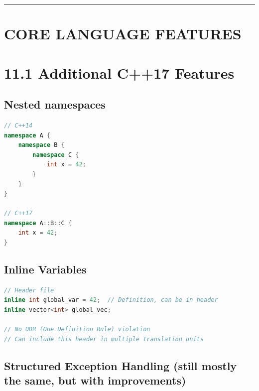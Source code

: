 \begin{center}\rule{0.5\linewidth}{0.5pt}\end{center}

\hypertarget{core-language-features}{%
\section{CORE LANGUAGE FEATURES}\label{core-language-features}}

\hypertarget{additional-c17-features}{%
\section{11.1 Additional C++17 Features}\label{additional-c17-features}}

\hypertarget{nested-namespaces}{%
\subsection{Nested namespaces}\label{nested-namespaces}}

\begin{lstlisting}[language={C++}]
// C++14
namespace A {
    namespace B {
        namespace C {
            int x = 42;
        }
    }
}

// C++17
namespace A::B::C {
    int x = 42;
}
\end{lstlisting}

\hypertarget{inline-variables}{%
\subsection{Inline Variables}\label{inline-variables}}

\begin{lstlisting}[language={C++}]
// Header file
inline int global_var = 42;  // Definition, can be in header
inline vector<int> global_vec;

// No ODR (One Definition Rule) violation
// Can include this header in multiple translation units
\end{lstlisting}

\hypertarget{structured-exception-handling-still-mostly-the-same-but-with-improvements}{%
\subsection{Structured Exception Handling (still mostly the same, but
with
improvements)}\label{structured-exception-handling-still-mostly-the-same-but-with-improvements}}

